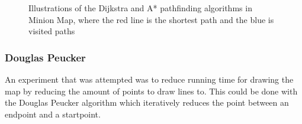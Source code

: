 \begin{figure}[ht]%
  \centering
  \label{Pathfinding/dijkstraPic}%
  \caption{Illustrations of the Dijkstra and A* pathfinding algorithms in Minion Map, where the red line is the shortest path and the blue is visited paths}
\end{figure}
\newpage
\subsubsection{Douglas Peucker}
An experiment that was attempted was to reduce running time for drawing the map by reducing the amount of points to draw lines to. This could be done with the Douglas Peucker algorithm which iteratively reduces the point between an endpoint and a startpoint. \cite{Douglas/Peucker}

